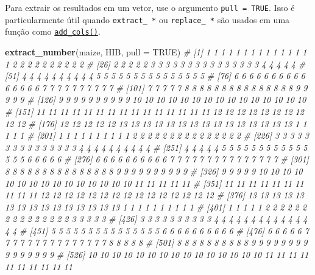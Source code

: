 \documentclass[
]{book}
\newenvironment{Shaded}{\begin{snugshade}}{\end{snugshade}}
\newcommand{\CommentTok}[1]{\textcolor[rgb]{0.56,0.35,0.01}{\textit{#1}}}
\newcommand{\DataTypeTok}[1]{\textcolor[rgb]{0.13,0.29,0.53}{#1}}
\newcommand{\KeywordTok}[1]{\textcolor[rgb]{0.13,0.29,0.53}{\textbf{#1}}}
\newcommand{\NormalTok}[1]{#1}
\newcommand{\OtherTok}[1]{\textcolor[rgb]{0.56,0.35,0.01}{#1}}
\begin{document}
Para extrair os resultados em um vetor, use o argumento \texttt{pull\ =\ TRUE}. Isso é particularmente útil quando \texttt{extract\_\ *} ou \texttt{replace\_\ *} são usados em uma função como \href{https://tiagoolivoto.github.io/metan/reference/utils_rows_cols.html}{\texttt{add\_cols()}}.

\begin{Shaded}
\begin{Highlighting}[]
\KeywordTok{extract_number}\NormalTok{(maize, HIB, }\DataTypeTok{pull =} \OtherTok{TRUE}\NormalTok{)}
\CommentTok{#   [1]  1  1  1  1  1  1  1  1  1  1  1  1  1  1  1  2  2  2  2  2  2  2  2  2  2}
\CommentTok{#  [26]  2  2  2  2  2  3  3  3  3  3  3  3  3  3  3  3  3  3  3  3  4  4  4  4  4}
\CommentTok{#  [51]  4  4  4  4  4  4  4  4  4  4  5  5  5  5  5  5  5  5  5  5  5  5  5  5  5}
\CommentTok{#  [76]  6  6  6  6  6  6  6  6  6  6  6  6  6  6  6  7  7  7  7  7  7  7  7  7  7}
\CommentTok{# [101]  7  7  7  7  7  8  8  8  8  8  8  8  8  8  8  8  8  8  8  8  9  9  9  9  9}
\CommentTok{# [126]  9  9  9  9  9  9  9  9  9  9 10 10 10 10 10 10 10 10 10 10 10 10 10 10 10}
\CommentTok{# [151] 11 11 11 11 11 11 11 11 11 11 11 11 11 11 11 12 12 12 12 12 12 12 12 12 12}
\CommentTok{# [176] 12 12 12 12 12 13 13 13 13 13 13 13 13 13 13 13 13 13 13 13  1  1  1  1  1}
\CommentTok{# [201]  1  1  1  1  1  1  1  1  1  1  2  2  2  2  2  2  2  2  2  2  2  2  2  2  2}
\CommentTok{# [226]  3  3  3  3  3  3  3  3  3  3  3  3  3  3  3  4  4  4  4  4  4  4  4  4  4}
\CommentTok{# [251]  4  4  4  4  4  5  5  5  5  5  5  5  5  5  5  5  5  5  5  5  6  6  6  6  6}
\CommentTok{# [276]  6  6  6  6  6  6  6  6  6  6  7  7  7  7  7  7  7  7  7  7  7  7  7  7  7}
\CommentTok{# [301]  8  8  8  8  8  8  8  8  8  8  8  8  8  8  8  9  9  9  9  9  9  9  9  9  9}
\CommentTok{# [326]  9  9  9  9  9 10 10 10 10 10 10 10 10 10 10 10 10 10 10 10 11 11 11 11 11}
\CommentTok{# [351] 11 11 11 11 11 11 11 11 11 11 12 12 12 12 12 12 12 12 12 12 12 12 12 12 12}
\CommentTok{# [376] 13 13 13 13 13 13 13 13 13 13 13 13 13 13 13  1  1  1  1  1  1  1  1  1  1}
\CommentTok{# [401]  1  1  1  1  1  2  2  2  2  2  2  2  2  2  2  2  2  2  2  2  3  3  3  3  3}
\CommentTok{# [426]  3  3  3  3  3  3  3  3  3  3  4  4  4  4  4  4  4  4  4  4  4  4  4  4  4}
\CommentTok{# [451]  5  5  5  5  5  5  5  5  5  5  5  5  5  5  5  6  6  6  6  6  6  6  6  6  6}
\CommentTok{# [476]  6  6  6  6  6  7  7  7  7  7  7  7  7  7  7  7  7  7  7  7  8  8  8  8  8}
\CommentTok{# [501]  8  8  8  8  8  8  8  8  8  8  9  9  9  9  9  9  9  9  9  9  9  9  9  9  9}
\CommentTok{# [526] 10 10 10 10 10 10 10 10 10 10 10 10 10 10 10 11 11 11 11 11 11 11 11 11 11}

\end{Highlighting}
\end{Shaded}
\end{document}
